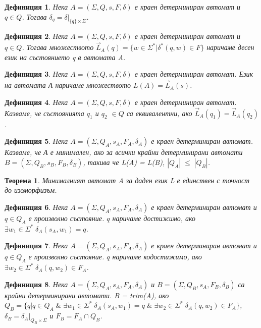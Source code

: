 \documentclass[a4paper,12pt]{article}
\newtheorem{thm}{Теорема}[section]
\newtheorem{defn}{Дефиниция}[section]
\begin{document}
\begin{defn}
Нека $A = (\Sigma, Q, s, F, \delta)$ е краен детерминиран автомат и $q \in Q$. Тогава $\delta_q = \left.{\delta}\right|_{\{q\} \times \Sigma}$.
\end{defn}

\begin{defn}
Нека $A = (\Sigma, Q, s, F, \delta)$ е краен детерминиран автомат и $q \in Q$. Тогава множеството
$\vec{L}_A(q) = \{w \in \Sigma^* | \delta^*(q, w) \in F\}$ наричаме десен език на състоянието q в автомата A.
\end{defn}

\begin{defn}
Нека $A = (\Sigma, Q, s, F, \delta)$ е краен детерминиран автомат. Език на автомата А наричаме множеството
$L(A) = \vec{L}_A(s)$.
\end{defn}

\begin{defn}
Нека $A = (\Sigma, Q, s, F, \delta)$ е краен детерминиран автомат. Казваме, че състоянията $q_1$ и $q_2$ $\in Q$ са еквивалентни,
ако $\vec{L}_A(q_1) = \vec{L}_A(q_2)$.
\end{defn}

\begin{defn}
Нека $A = (\Sigma, Q_A, s_A, F_A, \delta_A)$ е краен детерминиран автомат. Казваме, че А е минимален, ако за всички
крайни детерминирани автомати $B = (\Sigma, Q_B, s_B, F_B, \delta_B)$, такива че L(A) = L(B), $|Q_A|\;\leq\;|Q_B|$.
\end{defn}

\begin{thm}
Минималният автомат A за даден език L е единствен с точност до изоморфизъм.
\end{thm}

\begin{defn}
Нека $A = (\Sigma, Q_A, s_A, F_A, \delta_A)$ е краен детерминиран автомат и $q \in Q_A$ е произволно състояние. $q$ наричаме достижимо, ако
$\exists w_1 \in \Sigma^* \; \delta_A(s_A, w_1) = q$.
\end{defn}

\begin{defn}
Нека $A = (\Sigma, Q_A, s_A, F_A, \delta_A)$ е краен детерминиран автомат и $q \in Q_A$ е произволно състояние. $q$ наричаме кодостижимо, ако
$\exists w_2 \in \Sigma^* \; \delta_A(q, w_2) \in F_A$.
\end{defn}

\begin{defn}
Нека $A = (\Sigma, Q_A, s_A, F_A, \delta_A)$ и $B = (\Sigma, Q_B, s_A, F_B, \delta_B)$ са крайни детерминирани
автомати. B = trim(A), ако $Q_B = \{q | q \in Q_A \;\&\; \exists w_1 \in \Sigma^* \; \delta_A(s_A, w_1) = q \;\&\; \exists w_2 \in \Sigma^* \; \delta_A(q, w_2) \in F_A\} $,
$\delta_B = \left.{\delta_A}\right|_{Q_B \times \Sigma}$ и $F_B = F_A \cap Q_B$.
\end{defn}
\end{document}
